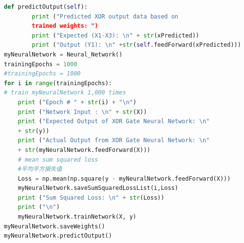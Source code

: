 \documentclass[12pt,a4paper]{article}
\begin{document}
\begin{flushleft}
\begin{lstlisting}[language=python]
    def predictOutput(self):
        print ("Predicted XOR output data based on 
        trained weights: ")
        print ("Expected (X1-X3): \n" + str(xPredicted))
        print ("Output (Y1): \n" +str(self.feedForward(xPredicted)))
myNeuralNetwork = Neural_Network()
trainingEpochs = 1000
#trainingEpochs = 1000
for i in range(trainingEpochs): 
# train myNeuralNetwork 1,000 times
    print ("Epoch # " + str(i) + "\n")
    print ("Network Input : \n" + str(X))
    print ("Expected Output of XOR Gate Neural Network: \n" 
    + str(y))
    print ("Actual Output from XOR Gate Neural Network: \n"
    + str(myNeuralNetwork.feedForward(X)))
    # mean sum squared loss
    #平均平方損失值
    Loss = np.mean(np.square(y - myNeuralNetwork.feedForward(X)))
    myNeuralNetwork.saveSumSquaredLossList(i,Loss)
    print ("Sum Squared Loss: \n" + str(Loss))
    print ("\n")
    myNeuralNetwork.trainNetwork(X, y)
myNeuralNetwork.saveWeights()
myNeuralNetwork.predictOutput()
\end{lstlisting}
\end{flushleft}
\end{document}
